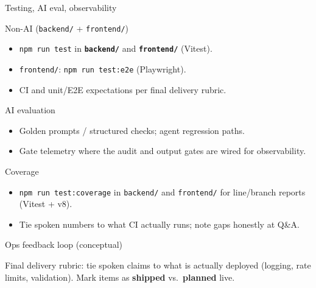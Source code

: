 \documentclass[10pt,compress,english]{beamer}
\begin{document}
\begin{frame}{Testing, AI eval, observability}
  \begin{block}{Non-AI (\texttt{backend/} + \texttt{frontend/})}
    \footnotesize
    \begin{itemize}\setlength\itemsep{0.2em}
      \item \texttt{npm run test} in \textbf{\texttt{backend/}} and \textbf{\texttt{frontend/}} (Vitest).
      \item \texttt{frontend/}: \texttt{npm run test:e2e} (Playwright).
      \item CI and unit/E2E expectations per final delivery rubric.
    \end{itemize}
  \end{block}
  \begin{block}{AI evaluation}
    \footnotesize
    \begin{itemize}\setlength\itemsep{0.2em}
      \item Golden prompts / structured checks; agent regression paths.
      \item Gate telemetry where the audit and output gates are wired for observability.
    \end{itemize}
  \end{block}
  \begin{block}{Coverage}
    \footnotesize
    \begin{itemize}\setlength\itemsep{0.2em}
      \item \texttt{npm run test:coverage} in \texttt{backend/} and \texttt{frontend/} for line/branch reports (Vitest + v8).
      \item Tie spoken numbers to what CI actually runs; note gaps honestly at Q\&A.
    \end{itemize}
  \end{block}
\end{frame}

\begin{frame}{Ops feedback loop (conceptual)}
  \begin{center}
  \end{center}
  \vfill
  \footnotesize
  Final delivery rubric: tie spoken claims to what is actually deployed (logging, rate limits, validation). Mark items as \textbf{shipped} vs.\ \textbf{planned} live.
\end{frame}
\end{document}
